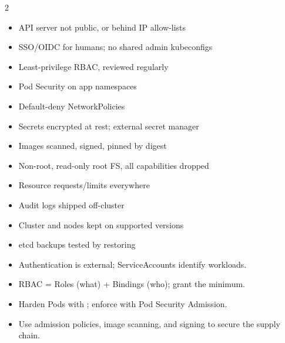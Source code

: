 \begin{multicols}{2}
\begin{itemize}
  \item[\textcolor{k8sgreen}{\faCheckSquare}] API server not public, or behind IP allow-lists
  \item[\textcolor{k8sgreen}{\faCheckSquare}] SSO/OIDC for humans; no shared admin kubeconfigs
  \item[\textcolor{k8sgreen}{\faCheckSquare}] Least-privilege RBAC, reviewed regularly
  \item[\textcolor{k8sgreen}{\faCheckSquare}]  Pod Security on app namespaces
  \item[\textcolor{k8sgreen}{\faCheckSquare}] Default-deny NetworkPolicies
  \item[\textcolor{k8sgreen}{\faCheckSquare}] Secrets encrypted at rest; external secret manager
  \item[\textcolor{k8sgreen}{\faCheckSquare}] Images scanned, signed, pinned by digest
  \item[\textcolor{k8sgreen}{\faCheckSquare}] Non-root, read-only root FS, all capabilities dropped
  \item[\textcolor{k8sgreen}{\faCheckSquare}] Resource requests/limits everywhere
  \item[\textcolor{k8sgreen}{\faCheckSquare}] Audit logs shipped off-cluster
  \item[\textcolor{k8sgreen}{\faCheckSquare}] Cluster and nodes kept on supported versions
  \item[\textcolor{k8sgreen}{\faCheckSquare}] etcd backups tested by restoring
\end{itemize}
\end{multicols}

\begin{recap}
\begin{itemize}
  \item Authentication is external; ServiceAccounts identify workloads.
  \item RBAC = Roles (what) + Bindings (who); grant the minimum.
  \item Harden Pods with ; enforce with Pod Security Admission.
  \item Use admission policies, image scanning, and signing to secure the supply chain.
\end{itemize}
\end{recap}
